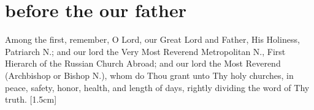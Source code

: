 \section{before the our father}

\begin{liturgicaltext}
    \priest Among the first, remember, O Lord, our Great Lord and Father, His Holiness, Patriarch N.; and our lord the Very Most Reverend Metropolitan N., First Hierarch of the Russian Church Abroad; and our lord the Most Reverend (Archbishop or Bishop N.), whom do Thou grant unto Thy holy churches, in peace, safety, honor, health, and length of days, rightly dividing the word of Thy truth.
    \choirsemisecret {} [1.5cm]
\end{liturgicaltext}

